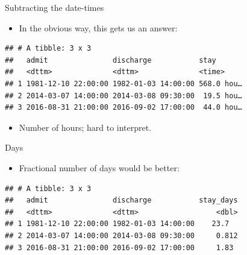 \documentclass[ignorenonframetext,]{beamer}
\newenvironment{Shaded}{\begin{snugshade}}{\end{snugshade}}
\newcommand{\DataTypeTok}[1]{\textcolor[rgb]{0.13,0.29,0.53}{#1}}
\newcommand{\DecValTok}[1]{\textcolor[rgb]{0.00,0.00,0.81}{#1}}
\newcommand{\KeywordTok}[1]{\textcolor[rgb]{0.13,0.29,0.53}{\textbf{#1}}}
\newcommand{\NormalTok}[1]{#1}
\newcommand{\OperatorTok}[1]{\textcolor[rgb]{0.81,0.36,0.00}{\textbf{#1}}}
\newcommand{\StringTok}[1]{\textcolor[rgb]{0.31,0.60,0.02}{#1}}
\providecommand{\tightlist}{%
  \setlength{\itemsep}{0pt}\setlength{\parskip}{0pt}}
\begin{document}
\begin{frame}[fragile]{Subtracting the date-times}
\protect\hypertarget{subtracting-the-date-times}{}

\begin{itemize}
\tightlist
\item
  In the obvious way, this gets us an answer:
\end{itemize}

\begin{Shaded}
\end{Shaded}

\begin{verbatim}
## # A tibble: 3 x 3
##   admit               discharge           stay      
##   <dttm>              <dttm>              <time>    
## 1 1981-12-10 22:00:00 1982-01-03 14:00:00 568.0 hou…
## 2 2014-03-07 14:00:00 2014-03-08 09:30:00  19.5 hou…
## 3 2016-08-31 21:00:00 2016-09-02 17:00:00  44.0 hou…
\end{verbatim}

\begin{itemize}
\tightlist
\item
  Number of hours; hard to interpret.
\end{itemize}

\end{frame}

\begin{frame}[fragile]{Days}
\protect\hypertarget{days}{}

\begin{itemize}
\tightlist
\item
  Fractional number of days would be better:
\end{itemize}

\begin{Shaded}
\end{Shaded}

\begin{verbatim}
## # A tibble: 3 x 3
##   admit               discharge           stay_days
##   <dttm>              <dttm>                  <dbl>
## 1 1981-12-10 22:00:00 1982-01-03 14:00:00    23.7  
## 2 2014-03-07 14:00:00 2014-03-08 09:30:00     0.812
## 3 2016-08-31 21:00:00 2016-09-02 17:00:00     1.83
\end{verbatim}

\end{frame}
\end{document}
